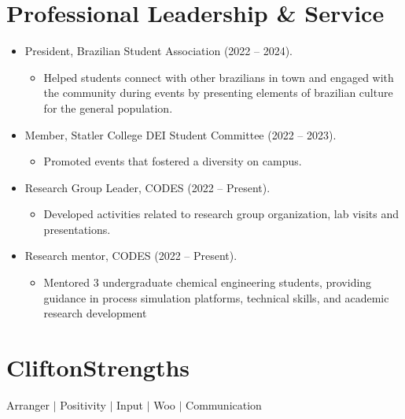\documentclass[letterpaper,11pt]{article}
\newcommand{\resumeItem}[1]{
  \item\small{
    {#1 \vspace{-2pt}}
  }
}
\newcommand{\resumeSubHeadingListStart}{\begin{itemize}[leftmargin=0.15in, label={}]}
\newcommand{\resumeSubHeadingListEnd}{\end{itemize}}
\newcommand{\resumeItemListStart}{\begin{itemize}}
\newcommand{\resumeItemListEnd}{\end{itemize}\vspace{-5pt}}
\begin{document}
\section*{Professional Leadership \& Service}
\resumeItemListStart
    \resumeItem{President, Brazilian Student Association (2022 – 2024).}
    \resumeItemListStart
      \resumeItem{Helped students connect with other brazilians in town and engaged with the community during events by presenting elements of brazilian culture for the general population. }
    \resumeItemListEnd
    \resumeItem{Member, Statler College DEI Student Committee (2022 – 2023).}
    \resumeItemListStart
      \resumeItem{Promoted events that fostered a diversity on campus.}
    \resumeItemListEnd
    \resumeItem{Research Group Leader, CODES (2022 – Present).}
    \resumeItemListStart
      \resumeItem{Developed activities related to research group organization, lab visits and presentations.}
    \resumeItemListEnd
    \resumeItem{Research mentor, CODES (2022 – Present).}
    \resumeItemListStart
      \resumeItem{Mentored 3 undergraduate chemical engineering students, 
      providing guidance in process simulation platforms, technical skills, and academic research development}
    \resumeItemListEnd

\resumeItemListEnd


\section{CliftonStrengths}
\vspace{2pt}
\resumeSubHeadingListStart
  \small{\item{
      Arranger $|$ Positivity $|$ Input $|$ Woo $|$ Communication
  }}
\resumeSubHeadingListEnd
\end{document}
